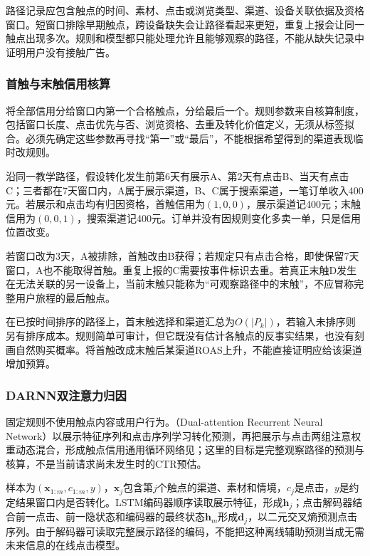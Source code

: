 路径记录应包含触点的时间、素材、点击或浏览类型、渠道、设备关联依据及资格窗口。短窗口排除早期触点，跨设备缺失会让路径看起来更短，重复上报会让同一触点出现多次。规则和模型都只能处理允许且能够观察的路径，不能从缺失记录中证明用户没有接触广告。

\subsubsection{首触与末触信用核算}
\label{sec:rs-advertising-first-last}

将全部信用分给窗口内第一个合格触点，分给最后一个。规则参数来自核算制度，包括窗口长度、点击优先与否、浏览资格、去重及转化价值定义，无须从标签拟合。必须先确定这些参数再寻找“第一”或“最后”，不能根据希望得到的渠道表现临时改规则。

沿同一教学路径，假设转化发生前第6天有展示A、第2天有点击B、当天有点击C；三者都在7天窗口内，A属于展示渠道，B、C属于搜索渠道，一笔订单收入400元。若展示和点击均有归因资格，首触信用为$(1,0,0)$，展示渠道记400元；末触信用为$(0,0,1)$，搜索渠道记400元。订单并没有因规则变化多卖一单，只是信用位置改变。

若窗口改为3天，A被排除，首触改由B获得；若规定只有点击合格，即使保留7天窗口，A也不能取得首触。重复上报的C需要按事件标识去重。若真正末触D发生在无法关联的另一设备上，当前末触只能称为“可观察路径中的末触”，不应冒称完整用户旅程的最后触点。

在已按时间排序的路径上，首末触选择和渠道汇总为$O(|P_k|)$，若输入未排序则另有排序成本。规则简单可审计，但它既没有估计各触点的反事实结果，也没有刻画自然购买概率。将首触改成末触后某渠道ROAS上升，不能直接证明应给该渠道增加预算。

\subsubsection{DARNN双注意力归因}
\label{sec:rs-advertising-darnn}

固定规则不使用触点内容或用户行为。（Dual-attention Recurrent Neural Network）以展示特征序列和点击序列学习转化预测，再把展示与点击两组注意权重动态混合，形成触点信用通用循环网络见；这里的目标是完整观察路径的预测与核算，不是当前请求尚未发生时的CTR预估。

样本为$(\bm{x}_{1:m},c_{1:m},y)$，$\bm{x}_j$包含第$j$个触点的渠道、素材和情境，$c_j$是点击，$y$是约定结果窗口内是否转化。LSTM编码器顺序读取展示特征，形成$\bm{h}_j$；点击解码器结合前一点击、前一隐状态和编码器的最终状态$\bm{h}_m$形成$\bm{d}_j$，以二元交叉熵预测点击序列。由于解码器可读取完整展示路径的编码，不能把这种离线辅助预测当成无需未来信息的在线点击模型。

